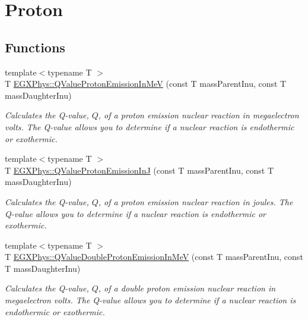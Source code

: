 \hypertarget{group___e_g_x_phys-_q_value-_proton}{}\section{Proton}
\label{group___e_g_x_phys-_q_value-_proton}
\subsection*{Functions}
\begin{DoxyCompactItemize}
\item 
{\footnotesize template$<$typename T $>$ }\\T \mbox{\hyperlink{group___e_g_x_phys-_q_value-_proton_ga5d92756e945e66bd2ed7d55145b95c3b}{E\+G\+X\+Phys\+::\+Q\+Value\+Proton\+Emission\+In\+MeV}} (const T mass\+Parent\+Inu, const T mass\+Daughter\+Inu)
\begin{DoxyCompactList}\small\item\em Calculates the Q-\/value, $Q$, of a proton emission nuclear reaction in megaelectron volts. The Q-\/value allows you to determine if a nuclear reaction is endothermic or exothermic. \end{DoxyCompactList}\item 
{\footnotesize template$<$typename T $>$ }\\T \mbox{\hyperlink{group___e_g_x_phys-_q_value-_proton_ga41f19b0d9a2dc06e89de44aaa2d48d62}{E\+G\+X\+Phys\+::\+Q\+Value\+Proton\+Emission\+InJ}} (const T mass\+Parent\+Inu, const T mass\+Daughter\+Inu)
\begin{DoxyCompactList}\small\item\em Calculates the Q-\/value, $Q$, of a proton emission nuclear reaction in joules. The Q-\/value allows you to determine if a nuclear reaction is endothermic or exothermic. \end{DoxyCompactList}\item 
{\footnotesize template$<$typename T $>$ }\\T \mbox{\hyperlink{group___e_g_x_phys-_q_value-_proton_ga61d07711da603f2f4426fbb3f271fc34}{E\+G\+X\+Phys\+::\+Q\+Value\+Double\+Proton\+Emission\+In\+MeV}} (const T mass\+Parent\+Inu, const T mass\+Daughter\+Inu)
\begin{DoxyCompactList}\small\item\em Calculates the Q-\/value, $Q$, of a double proton emission nuclear reaction in megaelectron volts. The Q-\/value allows you to determine if a nuclear reaction is endothermic or exothermic. \end{DoxyCompactList}\item 

\end{DoxyCompactItemize}
